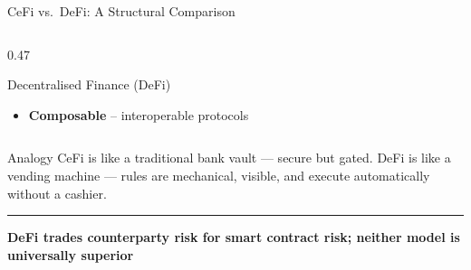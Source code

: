 \documentclass[8pt,aspectratio=169]{beamer}
\newcommand{\bottomnote}[1]{\vfill\vspace{-2mm}\textcolor{mllavender2}{\rule{\textwidth}{0.4pt}}\vspace{1mm}\footnotesize\textbf{#1}}
\begin{document}
\begin{frame}{CeFi vs.\ DeFi: A Structural Comparison}
\begin{columns}[T]
\begin{column}{0.47\textwidth}
\begin{block}{\textcolor{mlgreen}{Decentralised Finance (DeFi)}}
\begin{itemize}
          \item[\textcolor{mlgreen}{$\checkmark$}] \textbf{Composable} -- interoperable protocols
        \end{itemize}
      \end{block}
    \end{column}
  \end{columns}
  \vspace{4mm}
  \begin{block}{Analogy}
    CeFi is like a traditional bank vault --- secure but gated. DeFi is like a vending machine ---
    rules are mechanical, visible, and execute automatically without a cashier.
  \end{block}
  \bottomnote{DeFi trades counterparty risk for smart contract risk; neither model is universally superior}
\end{frame}
\end{document}
